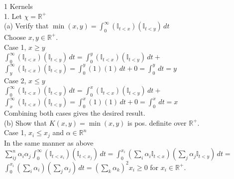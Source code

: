 \documentclass[18pt]{article}
\author{Adam Handwerger}
\begin{document}
\begin{flushleft}
    1 Kernels\\
    \vspace{.4cm}
    1. Let $\chi=\mathbb{R}^{+} $\\
    \vspace{.4cm}
    (a) Verify that $ \min(x,y)=\int_{0}^\infty (\mathbb{I}_{t<x}) (\mathbb{I}_{t<y}) \,dt $\\
    \vspace{.4cm}
    Choose $x,y \in \mathbb{R}^{+}$.\\
    \vspace{.4cm}
    Case 1, $x \geq y$\\
    \vspace{.4cm}
    $\int_{0}^{\infty} (\mathbb{I}_{t<x}) (\mathbb{I}_{t<y}) \,dt=\int_{0}^{y} (\mathbb{I}_{t<x}) (\mathbb{I}_{t<y}) \,dt+$\\
    $\int_{y}^{\infty} (\mathbb{I}_{t<x}) (\mathbb{I}_{t<y})=\int_{0}^{y} (1)(1) \,dt +0= \int_{0}^{y} \,dt=y$\\
    \vspace{.4cm}
    Case 2, $ x\leq y$\\
    \vspace{.4cm}
    $\int_{0}^{\infty} (\mathbb{I}_{t<x}) (\mathbb{I}_{t<y}) \,dt=\int_{0}^{x} (\mathbb{I}_{t<x}) (\mathbb{I}_{t<y}) \,dt+$\\
    $\int_{x}^{\infty} (\mathbb{I}_{t<x}) (\mathbb{I}_{t<y})=\int_{0}^{x} (1)(1) \,dt +0= \int_{0}^{x} \,dt=x$\\
    \vspace{.4cm}
    Combining both cases gives the desired result.\\
    \vspace{.4cm}
    (b) Show that $K(x,y)=\min(x,y)$ is pos. definite over $\mathbb{R}^{+}$.\\
    \vspace{.4cm}
    Case 1, $x_i \leq x_j$ and $\alpha\in\mathbb{R}^n$\\
    \vspace{.4cm}
    In the same manner as above\\
    \vspace{.4cm}
    $\sum_{ij}^n \alpha_i \alpha_j \int_{0}^{\infty} (\mathbb{I}_{t<x_i}) (\mathbb{I}_{t<x_j}) \,dt=\int_{0}^{x_i} (\sum_i \alpha_i \mathbb{I}_{t<x}) (\sum_j \alpha_j \mathbb{I}_{t<y}) \,dt=$\\
    $\int_0^{x_i} (\sum_i \alpha_i)(\sum_j \alpha_j) \,dt=(\sum_k \alpha_k)^2 x_i \geq 0$ for $x_i \in \mathbb{R}^{+}$.\\

\end{flushleft}
\end{document}

